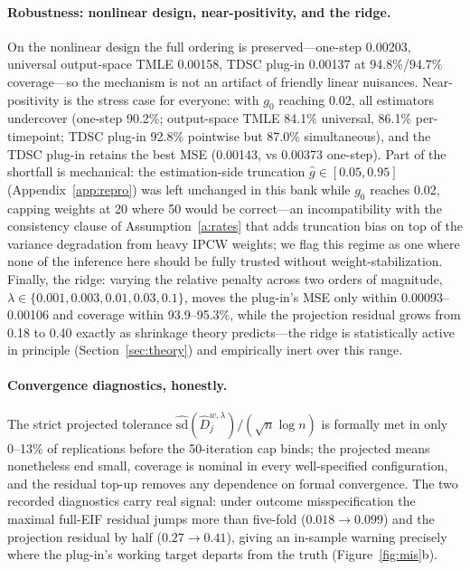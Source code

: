 \documentclass[11pt]{article}
\theoremstyle{remark}
\begin{document}
\paragraph{Robustness: nonlinear design, near-positivity, and the ridge.} On the nonlinear design the full ordering is preserved---one-step 0.00203, universal output-space TMLE 0.00158, TDSC plug-in 0.00137 at 94.8\%/94.7\% coverage---so the mechanism is not an artifact of friendly linear nuisances. Near-positivity is the stress case for everyone: with $g_0$ reaching 0.02, all estimators undercover (one-step 90.2\%; output-space TMLE 84.1\% universal, 86.1\% per-timepoint; TDSC plug-in 92.8\% pointwise but 87.0\% simultaneous), and the TDSC plug-in retains the best MSE (0.00143, vs 0.00373 one-step). Part of the shortfall is mechanical: the estimation-side truncation $\hat g \in [0.05, 0.95]$ (Appendix~\ref{app:repro}) was left unchanged in this bank while $g_0$ reaches 0.02, capping weights at 20 where 50 would be correct---an incompatibility with the consistency clause of Assumption~\ref{a:rates} that adds truncation bias on top of the variance degradation from heavy IPCW weights; we flag this regime as one where none of the inference here should be fully trusted without weight-stabilization. Finally, the ridge: varying the relative penalty across two orders of magnitude, $\lambda \in \{0.001, 0.003, 0.01, 0.03, 0.1\}$, moves the plug-in's MSE only within 0.00093--0.00106 and coverage within 93.9--95.3\%, while the projection residual grows from 0.18 to 0.40 exactly as shrinkage theory predicts---the ridge is statistically active in principle (Section~\ref{sec:theory}) and empirically inert over this range.

\paragraph{Convergence diagnostics, honestly.} The strict projected tolerance $\widehat{\mathrm{sd}}(\widehat D^{w,\lambda}_j)/(\sqrt n \log n)$ is formally met in only 0--13\% of replications before the 50-iteration cap binds; the projected means nonetheless end small, coverage is nominal in every well-specified configuration, and the residual top-up removes any dependence on formal convergence. The two recorded diagnostics carry real signal: under outcome misspecification the maximal full-EIF residual jumps more than five-fold ($0.018 \to 0.099$) and the projection residual by half ($0.27 \to 0.41$), giving an in-sample warning precisely where the plug-in's working target departs from the truth (Figure~\ref{fig:mis}b).
\end{document}
